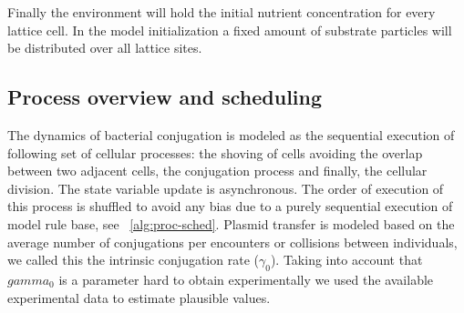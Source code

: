 Finally the environment will hold the initial nutrient concentration for every lattice cell.  In the model initialization a fixed amount of substrate particles will be distributed over all lattice sites.


\subsection{Process overview and scheduling}
 
The dynamics of bacterial conjugation is modeled as the sequential execution of following set of cellular processes: the shoving of cells avoiding the overlap between two adjacent cells, the conjugation process and finally, the cellular division.  The state variable update is asynchronous. The order of execution of this process is shuffled to avoid any bias due to a purely sequential execution of model rule base, see ~\ref{alg:proc-sched}. Plasmid transfer is modeled based on the average number of conjugations per encounters or collisions between individuals, we called this the intrinsic conjugation rate ($\gamma_0$). Taking into account that $gamma_0$ is a parameter hard to obtain experimentally we used the available experimental data to estimate plausible values.  

